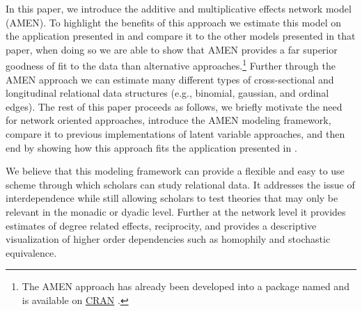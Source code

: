In this paper, we introduce the additive and multiplicative effects network model (AMEN). To highlight the benefits of this approach we estimate this model on the application presented in \citet{cranmer:etal:2016} and compare it to the other models presented in that paper, when doing so we are able to show that AMEN provides a far superior goodness of fit to the data than alternative approaches.\footnote{The AMEN approach has already been developed into a package named  and is available on \href{https://cran.r-project.org/web/packages/amen/index.html}{CRAN} \citep{hoff:etal:2015}.} Further through the AMEN approach we can estimate many different types of cross-sectional and longitudinal relational data structures (e.g., binomial, gaussian, and ordinal edges). The rest of this paper proceeds as follows, we briefly motivate the need for network oriented approaches, introduce the AMEN modeling framework, compare it to previous implementations of latent variable approaches, and then end by showing how this approach fits the application presented in \citet{cranmer:etal:2016}. 

We believe that this modeling framework can provide a flexible and easy to use scheme through which scholars can study relational data. It addresses the issue of interdependence while still allowing scholars to test theories that may only be relevant in the monadic or dyadic level. Further at the network level it provides estimates of degree related effects, reciprocity, and provides a descriptive visualization of higher order dependencies such as homophily and stochastic equivalence. 





